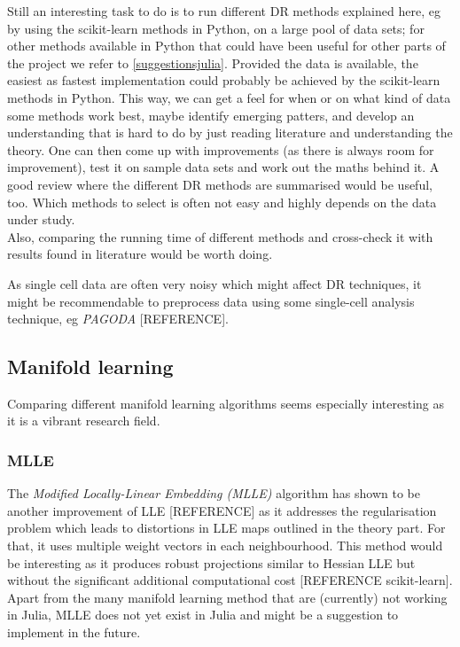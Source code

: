\documentclass[journal, a4paper]{IEEEtran}
\begin{document}
Still an interesting task to do is to run different DR methods explained here, eg by using the scikit-learn methods in Python, on a large pool of data sets; for other methods available in Python that could have been useful for other parts of the project we refer to \ref{suggestionsjulia}. Provided the data is available, the easiest as fastest implementation could probably be achieved by the scikit-learn methods in Python. This way, we can get a feel for when or on what kind of data some methods work best, maybe identify emerging patters, and develop an understanding that is hard to do by just reading literature and understanding the theory. One can then come up with improvements (as there is always room for improvement), test it on sample data sets and work out the maths behind it. A good review where the different DR methods are summarised would be useful, too. Which methods to select is often not easy and highly depends on the data under study.\\

Also, comparing the running time of different methods and cross-check it with results found in literature would be worth doing.

As single cell data are often very noisy which might affect DR techniques, it might be recommendable to preprocess data using some single-cell analysis technique, eg \textit{PAGODA} [REFERENCE].


\subsection{Manifold learning}
Comparing different manifold learning algorithms seems especially interesting as it is a vibrant research field.\\

\subsubsection{MLLE}
The \textit{Modified Locally-Linear Embedding (MLLE)} algorithm has shown to be another improvement of LLE [REFERENCE] as it addresses the regularisation problem which leads to distortions in LLE maps outlined in the theory part. For that, it uses multiple weight vectors in each neighbourhood. This method would be interesting as it produces robust projections similar to Hessian LLE but without the significant additional computational cost [REFERENCE scikit-learn].
Apart from the many manifold learning method that are (currently) not working in Julia, MLLE does not yet exist in Julia and might be a suggestion to implement in the future.\\
\end{document}
